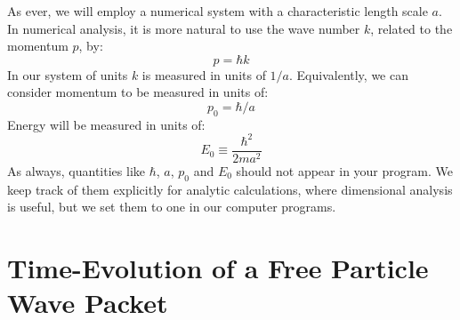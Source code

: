 \documentclass[12pt]{article}
\begin{document}
As ever, we will employ a numerical system with a characteristic
length scale $a$.  In numerical analysis, it is more natural to use
the wave number $k$, related to the momentum $p$, by:
$$p = \hbar k$$
In our system of units $k$ is measured in units of $1/a$.
Equivalently, we can consider momentum to be measured in units of:
$$p_0 = \hbar /a $$
Energy will be measured in units of:
\begin{equation}
E_0 \equiv \frac{\hbar^2}{2ma^2}
\end{equation}
As always, quantities like $\hbar$, $a$, $p_0$ and $E_0$ should not
appear in your program.  We keep track of them explicitly for analytic
calculations, where dimensional analysis is useful, but we set them to
one in our computer programs.

\section{Time-Evolution of a Free Particle Wave Packet}
\end{document}
